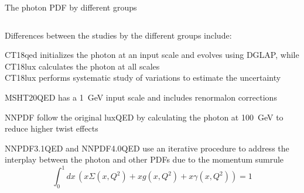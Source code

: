 \documentclass[aspectratio=169, 8pt,t]{beamer}
\begin{document}
\begin{frame}{The photon PDF by different groups}
  \begin{columns}[T]
    \begin{column}{0.59\textwidth}


      Differences between the studies by the different groups include:

      \vspace*{1em}
      CT18qed initializes the photon at an input scale and evolves using DGLAP, while CT18lux calculates the photon at all scales\\

      \vspace*{0.5em}
      CT18lux performs systematic study of variations to estimate the uncertainty

      \vspace*{1em}
      MSHT20QED has a 1~GeV input scale and includes renormalon corrections

      \vspace*{1em}
      NNPDF follow the original luxQED by calculating the photon at 100~GeV to reduce higher twist effects

      \vspace*{0.5em}
      NNPDF3.1QED and NNPDF4.0QED use an iterative procedure to address the interplay between the photon and other PDFs due to the momentum sumrule
      \begin{equation*}
        \int_0^1 dx\, \left(  x\Sigma(x,Q^2) + xg(x,Q^2) + x\gamma(x,Q^2) \right) =1
      \end{equation*}
    \end{column}


\end{columns}
\end{frame}
\end{document}
